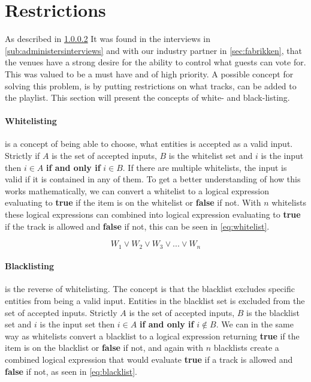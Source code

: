 \section{Restrictions}
\label{sec:restrictions}

As described in \cref{} It was found in the interviews in \cref{sub:administersinterviews} and with our industry partner in \cref{sec:fabrikken}, that the venues have a strong desire for the ability to control what guests can vote for. This was valued to be a must have and of high priority. A possible concept for solving this problem, is by putting restrictions on what tracks, can be added to the playlist. This section will present the concepts of white- and black-listing.

\paragraph{Whitelisting} is a concept of being able to choose, what entities is accepted as a valid input. Strictly if $A$ is the set of accepted inputs, $B$ is the whitelist set and $i$ is the input then $i \in A$ \textbf{if and only if} $i \in B$. If there are multiple whitelists, the input is valid if it is contained in any of them.
To get a better understanding of how this works mathematically, we can convert a whitelist to a logical expression evaluating to \textbf{true} if the item is on the whitelist or \textbf{false} if not. With $n$ whitelists these logical expressions can combined into logical expression evaluating to \textbf{true} if the track is allowed and \textbf{false} if not, this can be seen in \cref{eq:whitelist}.

\begin{equation}
\label{eq:whitelist}
	W_1 \vee W_2 \vee W_3 \vee ... \vee W_n
\end{equation}

\paragraph{Blacklisting} is the reverse of whitelisting. The concept is that the blacklist excludes specific entities from being a valid input. Entities in the blacklist set is excluded from the set of accepted inputs. Strictly $A$ is the set of accepted inputs, $B$ is the blacklist set and $i$ is the input set then $i \in A$ \textbf{if and only if} $i \notin B$.
We can in the same way as whitelists convert a blacklist to a logical expression returning \textbf{true} if the item is on the blacklist or \textbf{false} if not, and again with $n$ blacklists create a combined logical expression that would evaluate \textbf{true} if a track is allowed and \textbf{false} if not, as seen in \cref{eq:blacklist}.

